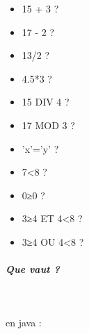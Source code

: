 \documentclass[11pt,a4paper]{article}
\begin{document}
					\begin{itemize}
				
			\item 15 + 3 ? \textcolor{gray}{\underline{\hspace*{2em}}} 
			\item 17 - 2 ? \textcolor{gray}{\underline{\hspace*{2em}}} 
			\item 13/2 ? \textcolor{gray}{\underline{\hspace*{2em}}} 
			\item 4.5*3 ? \textcolor{gray}{\underline{\hspace*{3em}}} 
			\item 15 DIV 4 ? \textcolor{gray}{\underline{\hspace*{1em}}} 
			\item 17 MOD 3 ?  \textcolor{gray}{\underline{\hspace*{1em}}} 
			\item 'x'='y' ? \textcolor{gray}{\underline{\hspace*{3em}}} 
			\item 7<8 ?  \textcolor{gray}{\underline{\hspace*{3em}}} 
			\item 0≥0 ?  \textcolor{gray}{\underline{\hspace*{3em}}} 
			\item 3≥4 ET 4<8 ?  \textcolor{gray}{\underline{\hspace*{3em}}} 
			\item 3≥4 OU 4<8 ?  \textcolor{gray}{\underline{\hspace*{3em}}} 
					\end{itemize}
				
			
		\subparagraph{Que vaut ?} 
		
                \textcolor{white}{.} \par
            
							  en java :
							
\end{document}
